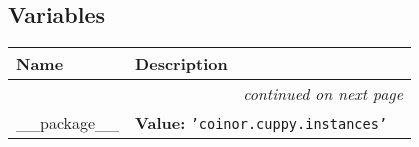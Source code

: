 
  \subsection{Variables}

    \vspace{-1cm}
\hspace{\varindent}\begin{longtable}{|p{\varnamewidth}|p{\vardescrwidth}|l}
\cline{1-2}
\cline{1-2} \centering \textbf{Name} & \centering \textbf{Description}& \\
\cline{1-2}
\endhead\cline{1-2}\multicolumn{3}{r}{\small\textit{continued on next page}}\\\endfoot\cline{1-2}
\endlastfoot\raggedright \_\-\_\-p\-a\-c\-k\-a\-g\-e\-\_\-\_\- & \raggedright \textbf{Value:} 
{\tt \texttt{'}\texttt{coinor.cuppy.instances}\texttt{'}}&\\
\cline{1-2}
\end{longtable}

